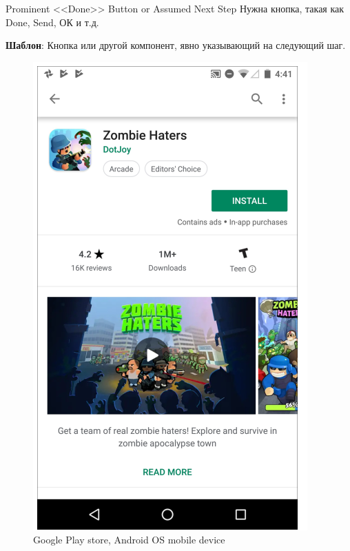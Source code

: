 \documentclass{beamer}
\begin{document}
\begin{frame}[t]{Prominent <<Done>> Button or Assumed Next Step}
	Нужна кнопка, такая как Done, Send, ОК  и т.д.
	
	\textbf{Шаблон}: Кнопка или другой компонент, явно указывающий на следующий шаг.
	\begin{figure}[h]
		\centering
		\includegraphics[scale=0.6]{images/lec08-pic09.png}
		\caption{Google Play store, Android OS mobile device}
	\end{figure}
\end{frame}
\end{document}
